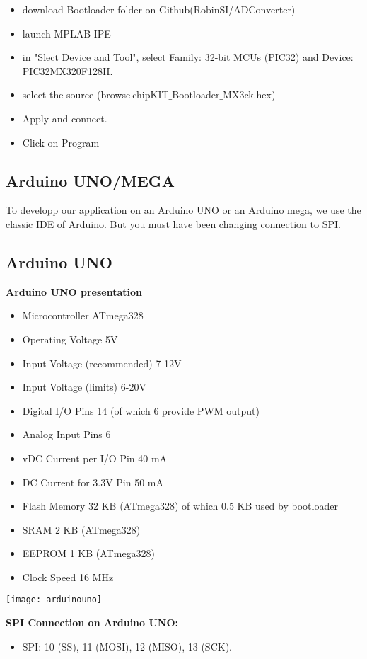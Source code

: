 \documentclass[10pt,a4paper]{report}
\begin{document}
\begin{itemize}
\item download Bootloader folder on Github(RobinSI/ADConverter)
\item launch MPLAB IPE
\item in "Slect Device and Tool", select Family: 32-bit MCUs (PIC32) and Device: PIC32MX320F128H.
\item select the source (browse$\ $chipKIT$\_$Bootloader$\_$MX3ck.hex)
\item Apply and connect.
\item Click on Program
\end{itemize}
\subsection{Arduino UNO/MEGA}
To developp our application on an Arduino UNO or an Arduino mega, we use the classic IDE of Arduino. But you must have been changing connection to SPI.

\subsection*{Arduino UNO}

\textbf{Arduino UNO presentation}\\
\begin{itemize}
\item Microcontroller	ATmega328
\item Operating Voltage	5V
\item Input Voltage (recommended)	7-12V
\item Input Voltage (limits)	6-20V
\item Digital I/O Pins	14 (of which 6 provide PWM output)
\item Analog Input Pins	6
\item vDC Current per I/O Pin	40 mA
\item DC Current for 3.3V Pin	50 mA
\item Flash Memory	32 KB (ATmega328) of which 0.5 KB used by bootloader
\item SRAM	2 KB (ATmega328)
\item EEPROM	1 KB (ATmega328)
\item Clock Speed	16 MHz
\end{itemize}
\begin{center}
\texttt{[image: arduinouno]}\\
\end{center}

\textbf{SPI Connection on Arduino UNO:}
\begin{itemize}
\item SPI: 10 (SS), 11 (MOSI), 12 (MISO), 13 (SCK). 
\end{itemize}
\end{document}
